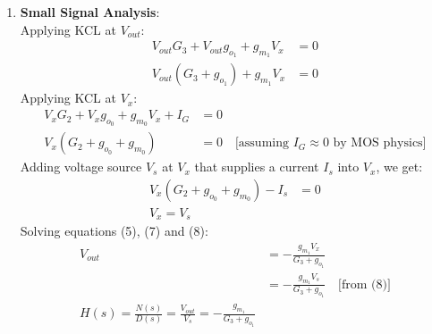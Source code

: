 \begin{enumerate}
\begin{align*}
    \end{align*}
    It can be seen that,
    \begin{align*}
      I_{in}  = I_{M_0} &\approx I_{M_1}  \quad \text{[if } k_{n_0} = k_{n_1} \text{]} \\
      I_{out} = I_{M_1}
    \end{align*}
    Thus,
    \begin{align*}
      \frac{I_{out}}{I_{in}} \approx \frac{I_{M_1}}{I_{M_0}} \approx \frac{k_{n_1}}{k_{n_0}} = \frac{\frac{\mu_n C_{ox} W_1}{L_1}}{\frac{\mu_n C_{ox} W_0}{L_0}} = \frac{\frac{W_1}{L_1}}{\frac{W_0}{L_0}} = \frac{W_1 L_0}{L_1 W_0}
    \end{align*}
  \item \textbf{Small Signal Analysis}:\\
    Applying KCL at $V_{out}$:
    \begin{align*}
      V_{out}G_3 + V_{out}g_{o_1} + g_{m_1}V_{x} &= 0 \\
      V_{out}(G_3 + g_{o_1}) + g_{m_1}V_{x} &= 0 \tag{5}
    \end{align*}
    Applying KCL at $V_{x}$:
    \begin{align*}
      V_{x}G_2 + V_{x}g_{o_0} + g_{m_0}V_{x} + I_{G} &= 0 \\
      V_{x}(G_2 + g_{o_0} + g_{m_0}) &= 0 \quad \text{[assuming } I_G \approx 0 \text{ by MOS physics]} \tag{6}
    \end{align*}
    Adding voltage source $V_s$ at $V_x$ that supplies
    a current $I_s$ into $V_{x}$, we get:
    \begin{align*}
      V_{x}(G_2 + g_{o_0} + g_{m_0}) - I_{s} &=0 \tag{7} \\
      V_{x} = V_{s} \tag{8}
    \end{align*}
    Solving equations (5), (7) and (8):
    \begin{align*}
      V_{out} &= - \frac{g_{m_1} V_{x}}{G_3 + g_{o_1}} \\
              &= - \frac{g_{m_1} V_{s}}{G_3 + g_{o_1}} \quad \text{[from (8)]} \\
      H(s) = \frac{N(s)}{D(s)} = \frac{V_{out}}{V_{s}} = - \frac{g_{m_1}}{G_3 + g_{o_1}}
    \end{align*}
\end{enumerate}

